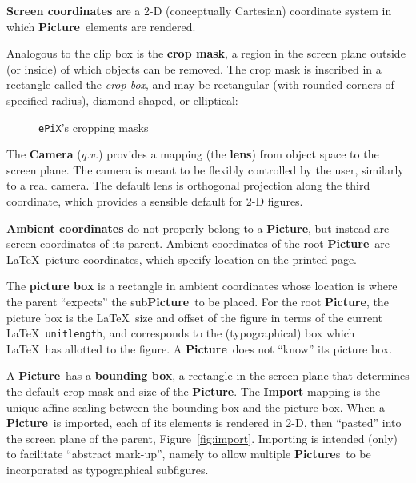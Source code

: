 \documentclass[12pt]{article}
\newcommand{\Class}[1]{\textbf{#1}}
\newcommand{\Program}[1]{\texttt{#1}}
\newcommand{\Picture}{\Class{Picture}}
\newcommand{\Pictures}{\Class{Picture}s}
\newcommand{\ePiX}{\Program{ePiX}}
\begin{document}
\medskip

\noindent\textbf{Screen coordinates} are a 2-D (conceptually
Cartesian) coordinate system in which \Picture\ elements are rendered.

Analogous to the clip box is the \textbf{crop mask}, a region in the
screen plane outside (or inside) of which objects can be removed. The
crop mask is inscribed in a rectangle called the \emph{crop box}, and
may be rectangular (with rounded corners of specified radius),
diamond-shaped, or elliptical:

\begin{figure}[hbt]
\begin{center}

\caption{\ePiX's cropping masks}
\label{fig:crop_masks}
\end{center}
\end{figure}

The \textbf{Camera} (\emph{q.v.}) provides a mapping (the
\textbf{lens}) from object space to the screen plane. The camera is
meant to be flexibly controlled by the user, similarly to a real
camera. The default lens is orthogonal projection along the third
coordinate, which provides a sensible default for 2-D figures.


\medskip

\noindent\textbf{Ambient coordinates} do not properly belong to a
\Picture, but instead are screen coordinates of its parent. Ambient
coordinates of the root \Picture\ are \LaTeX\ picture coordinates,
which specify location on the printed page.

The \textbf{picture box} is a rectangle in ambient coordinates whose
location is where the parent ``expects'' the sub\Picture\ to be
placed. For the root \Picture, the picture box is the \LaTeX\ size and
offset of the figure in terms of the current \LaTeX\ 
\texttt{unitlength}, and corresponds to the (typographical) box which
\LaTeX\ has allotted to the figure. A \Picture\ does not ``know'' its
picture box.

A \Picture\ has a \textbf{bounding box}, a rectangle in the screen
plane that determines the default crop mask and size of the \Picture.
The \textbf{Import} mapping is the unique affine scaling between the
bounding box and the picture box. When a \Picture\ is imported, each
of its elements is rendered in 2-D, then ``pasted'' into the screen
plane of the parent, Figure~\ref{fig:import}.  Importing is intended
(only) to facilitate ``abstract mark-up'', namely to allow multiple
\Pictures\ to be incorporated as typographical subfigures.
\end{document}
